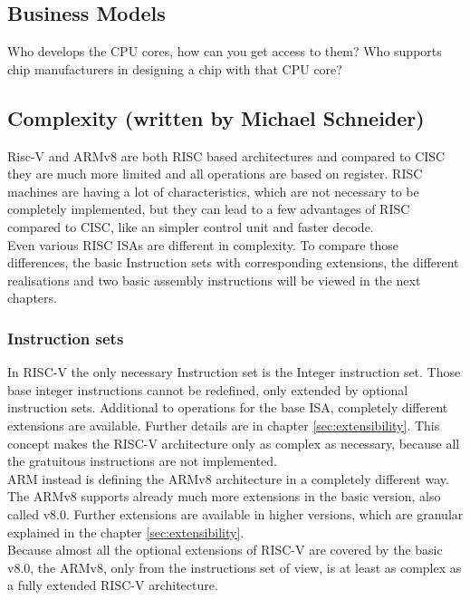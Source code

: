 \documentclass[conference]{IEEEtran}
\begin{document}
	\subsection{Business Models}
	Who develops the CPU cores, how can you get access to them? Who supports chip manufacturers in designing a chip with that CPU core?
	\subsection{Complexity (written by Michael Schneider)}
	Risc-V and ARMv8 are both \gls{RISC} based architectures and compared to \gls{CISC} they are much more limited and all operations are based on register. \gls{RISC} machines are having a lot of characteristics, which are not necessary to be completely implemented, but they can lead to a few advantages of \gls{RISC} compared to \gls{CISC}, like an simpler control unit and faster decode. \cite{George1990} \\
Even various \gls{RISC} \glspl{ISA} are different in complexity. To compare those differences, the basic Instruction sets with corresponding extensions, the different realisations and two basic assembly instructions will be viewed in the next chapters.
	\subsubsection{Instruction sets}
	In RISC-V the only necessary Instruction set is the Integer instruction set. Those base integer instructions cannot be redefined, only extended by optional instruction sets. Additional to operations for the base \gls{ISA}, completely different extensions are available. Further details are in chapter \ref{sec:extensibility}. This concept makes the RISC-V architecture only as complex as necessary, because all the gratuitous instructions are not implemented. \cite{Asanovic2016} \\
ARM instead is defining the ARMv8 architecture in a completely different way. The ARMv8 supports already much more extensions in the basic version, also called v8.0. Further extensions are available in higher versions, which are granular explained in the chapter \ref{sec:extensibility}. \cite{ArmManual} \\
Because almost all the optional extensions of RISC-V are covered by the basic v8.0, the ARMv8, only from the instructions set of view, is at least as complex as a fully extended RISC-V architecture. 
\end{document}
